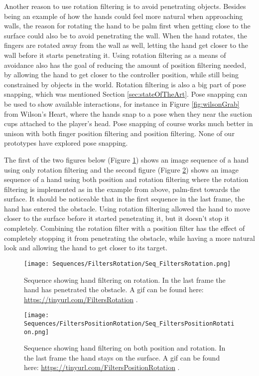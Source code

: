 Another reason to use rotation filtering is to avoid penetrating objects. Besides being an example of how the hands could feel more natural when approaching walls, the reason for rotating the hand to be palm first when getting close to the surface could also be to avoid penetrating the wall. When the hand rotates, the fingers are rotated away from the wall as well, letting the hand get closer to the wall before it starts penetrating it. Using rotation filtering as a means of avoidance also has the goal of reducing the amount of position filtering needed, by allowing the hand to get closer to the controller position, while still being constrained by objects in the world. Rotation filtering is also a big part of pose snapping, which was mentioned Section \ref{sec:stateOfTheArt}. Pose snapping can be used to show available interactions, for instance in Figure \ref{fig:wilsonGrab} from Wilson's Heart, where the hands snap to a pose when they near the suction cups attached to the player's head. Pose snapping of course works much better in unison with both finger position filtering and position filtering. None of our prototypes have explored pose snapping.

The first of the two figures below (Figure \ref{fig:filtersRotation}) shows an image sequence of a hand using only rotation filtering and the second figure (Figure \ref{fig:filtersPositionRotation}) shows an image sequence of a hand using both position and rotation filtering where the rotation filtering is implemented as in the example from above, palm-first towards the surface. It should be noticeable that in the first sequence in the last frame, the hand has entered the obstacle. Using rotation filtering allowed the hand to move closer to the surface before it started penetrating it, but it doesn't stop it completely. Combining the rotation filter with a position filter has the effect of completely stopping it from penetrating the obstacle, while having a more natural look and allowing the hand to get closer to its target.

\begin{figure}[H]
\centering
\texttt{[image: Sequences/FiltersRotation/Seq\_FiltersRotation.png]}
\caption{Sequence showing hand filtering on rotation. In the last frame the hand has penetrated the obstacle. A gif can be found here: \url{https://tinyurl.com/FiltersRotation} .}
\label{fig:filtersRotation}
\end{figure}

\begin{figure}[H]
\centering
\texttt{[image: Sequences/FiltersPositionRotation/Seq\_FiltersPositionRotation.png]}
\caption{Sequence showing hand filtering on both position and rotation. In the last frame the hand stays on the surface. A gif can be found here: \url{https://tinyurl.com/FiltersPositionRotation} .}
\label{fig:filtersPositionRotation}
\end{figure}

